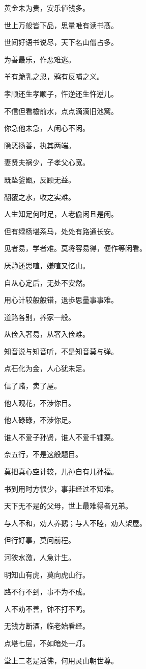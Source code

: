 \documentclass[12pt,oneside]{book}
\begin{document}
黄金未为贵，安乐値钱多。

世上万般皆下品，思量唯有读书髙。

世间好语书说尽，天下名山僧占多。

为善最乐，作恶难逃。

羊有跪乳之恩，鸦有反哺之义。

孝顺还生孝顺子，忤逆还生忤逆儿。

不信但看檐前水，点点滴滴旧池窝。

你急他未急，人闲心不闲。

隐恶扬善，执其两端。

妻贤夫祸少，子孝父心宽。

既坠釜甑，反顾无益。

翻覆之水，收之实难。

人生知足何时足，人老偸闲且是闲。

但有绿杨堪系马，处处有路通长安。

见者易，学者难。莫将容易得，便作等闲看。

厌静还思喧，嫌喧又忆山。

自从心定后，无处不安然。

用心计较般般错，退歩思量事事难。

道路各别，养家一般。

从俭入奢易，从奢入俭难。

知音说与知音听，不是知音莫与弹。

点石化为金，人心犹未足。

信了赌，卖了屋。

他人观花，不渉你目。

他人碌碌，不渉你足。

谁人不爱子孙贤，谁人不爱千锺粟。

奈五行，不是这般题目。

莫把真心空计较，儿孙自有儿孙福。

书到用时方恨少，事非经过不知难。

天下无不是的父母，世上最难得者兄弟。

与人不和，劝人养鹅；与人不睦，劝人架屋。

但行好事，莫问前程。

河狭水激，人急计生。

明知山有虎，莫向虎山行。

路不行不到，事不为不成。

人不劝不善，钟不打不鸣。

无钱方断酒，临老始看经。

点塔七层，不如暗处一灯。

堂上二老是活佛，何用灵山朝世尊。
\end{document}
